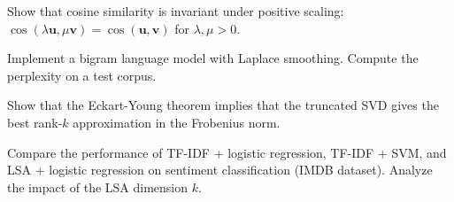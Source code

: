\begin{exercise}[$\star$]
Show that cosine similarity is invariant under positive scaling:
$\cos(\lambda \mathbf{u}, \mu \mathbf{v}) = \cos(\mathbf{u}, \mathbf{v})$ for
$\lambda, \mu > 0$.
\end{exercise}

\begin{exercise}[$\star\star$]
Implement a bigram language model with Laplace smoothing. Compute the
perplexity on a test corpus.
\end{exercise}

\begin{exercise}[$\star\star$]
Show that the Eckart-Young theorem implies that the truncated SVD gives the
best rank-$k$ approximation in the Frobenius norm.
\end{exercise}

\begin{exercise}[$\star\star\star$]
Compare the performance of TF-IDF + logistic regression, TF-IDF + SVM, and
LSA + logistic regression on sentiment classification (IMDB dataset). Analyze
the impact of the LSA dimension $k$.
\end{exercise}
